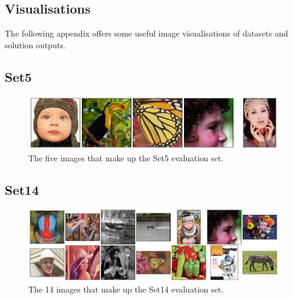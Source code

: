 \begin{appendices}
\chapter{Visualisations}
The following appendix offers some useful image visualisations of datasets and solution outputs.

\section{Set5}
\begin{figure}[H]
    \centering
    \includegraphics[width=\linewidth]{./assets/set5.png}
    \caption{The five images that make up the Set5 evaluation set.}
    \label{fig:model_comparison}
\end{figure}

\section{Set14}
\begin{figure}[H]
    \centering
    \includegraphics[width=\linewidth]{./assets/set14.png}
    \caption{The 14 images that make up the Set14 evaluation set.}
    \label{fig:model_comparison}
\end{figure}


\end{appendices}
